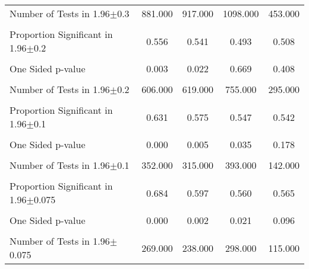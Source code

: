 {\begin{tabular}{l*{4}{c}}
Number of Tests in 1.96$\pm$0.3&  881.000         &  917.000         & 1098.000         &  453.000         \\
                &                  &                  &                  &                  \\
\hline Proportion Significant in 1.96$\pm$0.2&    0.556         &    0.541         &    0.493         &    0.508         \\
                &                  &                  &                  &                  \\
One Sided p-value&    0.003         &    0.022         &    0.669         &    0.408         \\
                &                  &                  &                  &                  \\
Number of Tests in 1.96$\pm$0.2&  606.000         &  619.000         &  755.000         &  295.000         \\
                &                  &                  &                  &                  \\
\hline Proportion Significant in 1.96$\pm$0.1&    0.631         &    0.575         &    0.547         &    0.542         \\
                &                  &                  &                  &                  \\
One Sided p-value&    0.000         &    0.005         &    0.035         &    0.178         \\
                &                  &                  &                  &                  \\
Number of Tests in 1.96$\pm$0.1&  352.000         &  315.000         &  393.000         &  142.000         \\
                &                  &                  &                  &                  \\
\hline Proportion Significant in 1.96$\pm$0.075&    0.684         &    0.597         &    0.560         &    0.565         \\
                &                  &                  &                  &                  \\
One Sided p-value&    0.000         &    0.002         &    0.021         &    0.096         \\
                &                  &                  &                  &                  \\
Number of Tests in 1.96$\pm$0.075&  269.000         &  238.000         &  298.000         &  115.000         \\

\end{tabular}}
